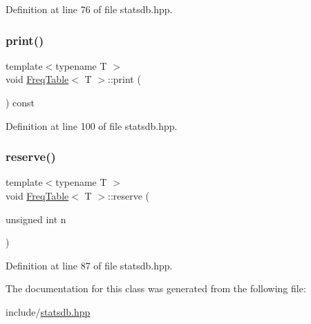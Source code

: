 Definition at line 76 of file statsdb.\+hpp.

\mbox{\label{class_freq_table_a4fe8f5e3b5bf64a1cbaf99deb96298d4}} 
\subsubsection{\texorpdfstring{print()}{print()}}
{\footnotesize\ttfamily template$<$typename T $>$ \\
void \hyperlink{class_freq_table}{Freq\+Table}$<$ T $>$\+::print (\begin{DoxyParamCaption}{ }\end{DoxyParamCaption}) const\hspace{0.3cm}{\ttfamily [inline]}}



Definition at line 100 of file statsdb.\+hpp.

\mbox{\label{class_freq_table_a0bdced25f7c0bee38e073c4654578d19}} 
\subsubsection{\texorpdfstring{reserve()}{reserve()}}
{\footnotesize\ttfamily template$<$typename T $>$ \\
void \hyperlink{class_freq_table}{Freq\+Table}$<$ T $>$\+::reserve (\begin{DoxyParamCaption}\item[{unsigned int}]{n }\end{DoxyParamCaption})\hspace{0.3cm}{\ttfamily [inline]}}



Definition at line 87 of file statsdb.\+hpp.



The documentation for this class was generated from the following file\+:\begin{DoxyCompactItemize}
\item 
include/\hyperlink{statsdb_8hpp}{statsdb.\+hpp}\end{DoxyCompactItemize}

